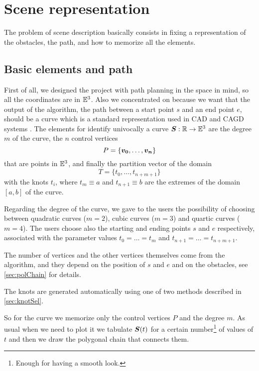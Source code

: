 \documentclass[dissertation.tex]{subfiles}
\begin{document}
\chapter{Scene representation}\label{cha:scene}
The problem of scene description basically consists in fixing a
representation of the obstacles, the path, and how to memorize all the
elements.

\section{Basic elements and path}
First of all, we designed the project with path planning in the space
in mind, so all the coordinates are in $\mathbb{E}^3$. Also we concentrated
on \bss because we want that the output of the algorithm, the
path between a start point $s$ and an end point $e$, should be a \bs
curve which is a standard representation used in \ac{CAD} and
\ac{CAGD} systems \cite{hughes}\cite{foley}. The
elements for identify univocally a curve
$\boldsymbol{S}:\mathbb{R}\rightarrow\mathbb{E}^3$ are the
degree $m$ of the curve, the $n$ control vertices
\begin{equation*}
  P=\{\boldsymbol{v_0},\dots,\boldsymbol{v_n}\}
\end{equation*}
that are points in $\mathbb{E}^3$, and finally the partition vector of the domain
\begin{equation*}
  T=\{t_0,\dots,t_{n+m+1}\}
\end{equation*}
with the knots $t_i$, where $t_m\equiv a$ and $t_{n+1}\equiv b$ are
the extremes of the domain $[a,b]$ of the curve.

Regarding the degree of the curve, we gave
to the users the possibility of choosing between quadratic curves
($m=2$), cubic curves ($m=3$) and quartic curves ($m=4$). The users
choose also the starting and ending points $s$ and $e$ respectively,
associated with the parameter values $t_0=\dots=t_m$ and
$t_{n+1}=\dots=t_{n+m+1}$.

The number
of vertices and the other vertices themselves come from the algorithm,
and they depend on the position of $s$ and $e$ and on the obstacles, see
\cref{sec:polChain} for details.

The knots are generated automatically using one of two methods
described in \cref{sec:knotSel}.

So for the curve we memorize only the control vertices $P$ and the
degree 
$m$. As usual when we need to plot it we tabulate $\boldsymbol{S}(t)$ for a certain
number\footnote{Enough for having a smooth look.} of values of $t$ and
then we draw the polygonal chain that connects them.
\end{document}
